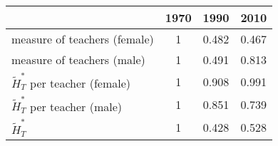 \begin{table}
  \centering \begin{tabular}{lccc}
\toprule
& 1970 & 1990 & 2010 \\
\midrule
measure of teachers (female) & 1 & 0.482 &0.467\\
measure of teachers (male) & 1 & 0.491 & 0.813\\
$\widetilde{H}_T^*$ per teacher (female)   & 1 & 0.908 & 0.991 \\
$\widetilde{H}_T^*$ per teacher (male)   & 1 & 0.851 & 0.739 \\
$\widetilde{H}_T^*$ & 1  & 0.428 & 0.528 \\
\bottomrule
\end{tabular}
  \label{ }
\end{table}